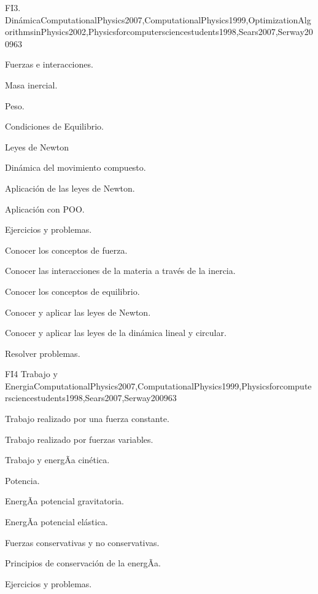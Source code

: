 \begin{syllabus}
\begin{unit}{FI3. Dinámica}{ComputationalPhysics2007,ComputationalPhysics1999,OptimizationAlgorithmsinPhysics2002,Physicsforcomputersciencestudents1998,Sears2007,Serway2009}{6}{3}
\begin{topics}
      \item Fuerzas e interacciones.
      \item Masa inercial.
      \item Peso.
      \item Condiciones de Equilibrio.
      \item Leyes de Newton
      \item Dinámica del movimiento compuesto.
      \item Aplicación de las leyes de Newton.
      \item Aplicación con POO.
      \item Ejercicios y problemas.
   \end{topics}

   \begin{unitgoals}
      \item Conocer los conceptos de fuerza.
      \item Conocer las interacciones de la materia a través de la inercia.
      \item Conocer los conceptos de equilibrio.
      \item Conocer y aplicar las leyes de Newton.      
      \item Conocer y aplicar las leyes de la dinámica lineal y circular.
      \item Resolver problemas.
   \end{unitgoals}
\end{unit}

\begin{unit}{FI4 Trabajo y Energia}{ComputationalPhysics2007,ComputationalPhysics1999,Physicsforcomputersciencestudents1998,Sears2007,Serway2009}{6}{3}
\begin{topics}
      \item Trabajo realizado por una fuerza constante.
      \item Trabajo realizado por fuerzas variables.
      \item Trabajo y energÃ­a cinética.
      \item Potencia.
      \item EnergÃ­a potencial gravitatoria.
      \item EnergÃ­a potencial elástica.
      \item Fuerzas conservativas y no conservativas.
      \item Principios de conservación de la energÃ­a.
      \item Ejercicios y problemas.
   \end{topics}


\end{unit}
\end{syllabus}
